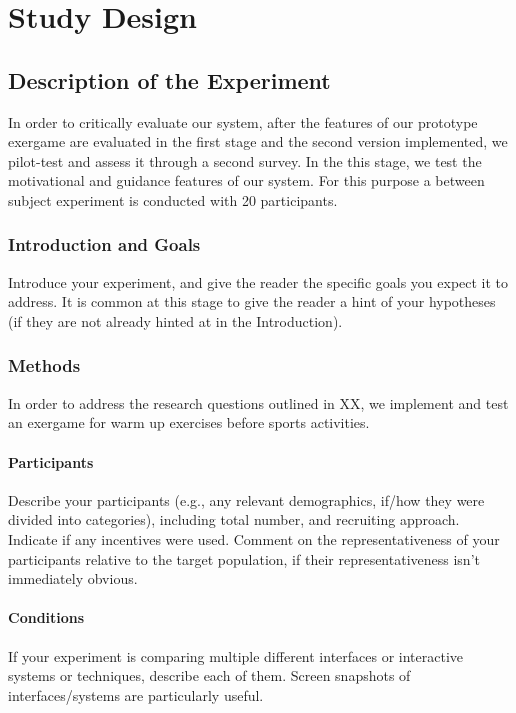 \chapter{Study Design}\label{chapter:studydesign}

\section{Description of the Experiment}

In order to critically evaluate our system, after the features of our prototype exergame are evaluated in the first stage and the second version implemented, we pilot-test and assess it through a second survey. In the this stage, we test the motivational and guidance features of our system. For this purpose a between subject experiment is conducted with 20 participants. 

\subsection{Introduction and Goals} 
Introduce your experiment, and give the reader the specific goals you expect it to address. It is common at this stage to give the reader a hint of your hypotheses (if they are not already hinted at in the Introduction).
\subsection{Methods} 
In order to address the research questions outlined in XX, we implement and test an exergame for warm up exercises before sports activities. 
\subsubsection{Participants}
Describe your participants (e.g., any relevant demographics, if/how they were divided into categories), including total number, and recruiting approach. Indicate if any incentives were used. Comment on the representativeness of your participants relative to the target population, if their representativeness isn’t immediately obvious.
\subsubsection{Conditions}
If your experiment is comparing multiple different interfaces or interactive systems or techniques, describe each of them. Screen snapshots of interfaces/systems are particularly useful.
